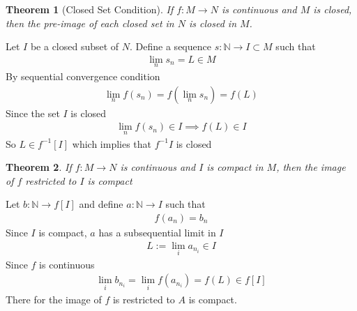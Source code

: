 \documentclass{amsart}
\numberwithin{equation}{section}
\let\oldendproof\endproof
\renewenvironment{proof}[1][\proofname]{%
  \setcounter{case}{0}
  \setcounter{step}{0}
  \oldproof[#1]%
}{\oldendproof}
\theoremstyle{plain}
\newtheorem{theorem}{Theorem}[section]
\newtheorem{corollary}[theorem]{Corollary}
\theoremstyle{definition}
\theoremstyle{remark}
\begin{document}
\begin{theorem}[Closed Set Condition]
  If $f:M\to N$ is continuous and $M$ is closed, then the pre-image of each closed set in $N$ is closed in $M$.
\end{theorem}
\begin{proof}
  Let $I$ be a closed subset of $N$. Define a sequence $s:\mathbb{N}\to I\subset M$ such that
  \begin{align}
    \lim_n s_n = L \in M
  \end{align}
  By sequential convergence condition
  \begin{align}
    \lim_n f(s_n) = f(\lim_n s_n ) = f(L)
  \end{align}
  Since the set $I$ is closed
  \begin{align}
    \lim_n f(s_n) \in I \implies f(L) \in I
  \end{align}
  So $L \in f^{-1} [I]$ which implies that $f^{-1} I$ is closed
\end{proof}


\begin{theorem}
  If $f:M\to N$ is continuous and $I$ is compact in $M$, then the image of $f$ restricted to $I$ is compact
\end{theorem}
\begin{proof}
  Let $b:\mathbb{N}\to f[I]$ and define $a:\mathbb{N}\to I$ such that
  \begin{align}
    f(a_n) = b_n
  \end{align}
  Since $I$ is compact, $a$ has a subsequential limit in $I$
  \begin{align}
    L:= \lim_i a_{n_i} \in I
  \end{align}
  Since $f$ is continuous
  \begin{align}
    \lim_i b_{n_i} = \lim_i f(a_{n_i}) = f(L) \in f[I]
  \end{align}
  There for the image of $f$ is restricted to $A$ is compact.
\end{proof}
\end{document}
